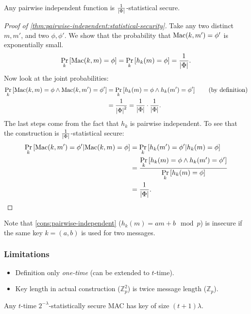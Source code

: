 \begin{theorem} \label{thm:pairwise-independent:statistical-security}
	Any pairwise independent function is $\frac{1}{\abs{\GenericAuthSpace}}$-statistical secure.
\end{theorem}

\begin{proof}[Proof of \cref{thm:pairwise-independent:statistical-security}]
	Take any two distinct $m, m'$, and two $\phi, \phi'$.
	We show that the probability that $\GenericMac(k,m') = \phi'$ is exponentially small.
	\begin{equation*}
		\Pr[k]{\GenericMac(k,m) = \phi} =
		\Pr[k]{h_k(m) = \phi} =
		\frac{1}{\abs{\GenericAuthSpace}}.
	\end{equation*}
	Now look at the joint probabilities:
	\begin{align*}
		\Pr[k]{\GenericMac(k,m) = \phi \land \GenericMac(k,m') = \phi'} 
		& = 
		\Pr[k]{h_k(m) = \phi \land h_k(m') = \phi'} 
		\tag{by definition}
		\\
		& =
		\frac{1}{\abs{\GenericAuthSpace}^2}
		=
		\frac{1}{\abs{\GenericAuthSpace}}
		\cdot
		\frac{1}{\abs{\GenericAuthSpace}}.
	\end{align*}
	The last steps come from the fact that $h_k$ is pairwise independent.
	To see that the construction is $\frac{1}{\abs{\GenericAuthSpace}}$-statistical secure:
	\begin{align*}
		\Pr[k]{\GenericMac(k, m') = \phi' | \GenericMac(k,m) = \phi}
		& =
		\Pr[k]{h_k(m') = \phi' | h_k(m) = \phi}
		\\
		& =
		\frac{\Pr[k]{h_k(m) = \phi \land h_k(m') = \phi'}}{\Pr[k]{h_k(m) = \phi}}
		\\
		& =
		\frac{1}{\abs{\GenericAuthSpace}}.
	\end{align*}
\end{proof}

Note that \cref{cons:pairwise-independent} ($h_k(m) = a m + b \mod p$) is insecure if the same key $k = (a,b)$ is used for two messages.

\subsubsection*{Limitations}
\begin{itemize}
    \item Definition only \textit{one-time} (can be extended to $t$-time).
    \item Key length in actual construction ($\mathbb{Z}_p^2$) is twice message length ($\mathbb{Z}_p$).
\end{itemize}
\begin{theorem}
	Any $t$-time $2^{-\lambda}$-statistically secure \ac{MAC} has key of size $(t+1)\lambda$.
\end{theorem}

